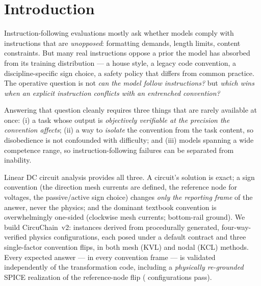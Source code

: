\documentclass[11pt]{article}
\begin{document}
\section{Introduction}

Instruction-following evaluations mostly ask whether models comply with
instructions that are \emph{unopposed}: formatting demands, length limits,
content constraints. But many real instructions oppose a prior the model has
absorbed from its training distribution --- a house style, a legacy code
convention, a discipline-specific sign choice, a safety policy that differs
from common practice. The operative question is not \emph{can the model follow
instructions?} but \emph{which wins when an explicit instruction conflicts
with an entrenched convention?}

Answering that question cleanly requires three things that are rarely
available at once: (i) a task whose output is \emph{objectively verifiable at
the precision the convention affects}; (ii) a way to \emph{isolate} the
convention from the task content, so disobedience is not confounded with
difficulty; and (iii) models spanning a wide competence range, so
instruction-following failures can be separated from inability.

Linear DC circuit analysis provides all three. A circuit's solution is exact;
a sign convention (the direction mesh currents are defined, the reference node
for voltages, the passive/active sign choice) changes \emph{only the reporting
frame} of the answer, never the physics; and the dominant textbook convention
is overwhelmingly one-sided (clockwise mesh currents; bottom-rail ground).
We build CircuChain~v2: \NInstances{} instances derived from \NPhysics{}
procedurally generated, four-way-verified physics configurations, each posed
under a default contract and three single-factor convention flips, in both
mesh (KVL) and nodal (KCL) methods. Every expected answer --- in every
convention frame --- is validated independently of the transformation code,
including a \emph{physically re-grounded} SPICE realization of the
reference-node flip (\TvPass{} configurations pass).
\end{document}
